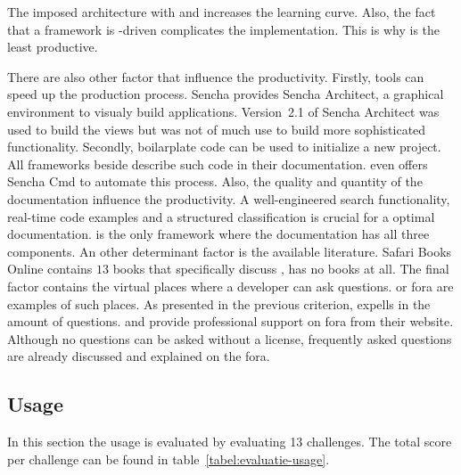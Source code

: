 \documentclass[a4paper]{artikel3}
\begin{document}

The imposed architecture with \sta{} and \kendob{} increases the learning curve.
Also, the fact that a framework is \js-driven complicates the implementation.
This is why \sta{} is the least productive.

There are also other factor that influence the productivity.
Firstly,  tools can speed up the production process.
Sencha provides Sencha Architect,  a graphical environment to visualy build applications.
Version~2.1 of Sencha Architect was used to build the views but was not of much use to build more sophisticated functionality.
Secondly,  boilarplate code can be used to initialize a new project.
All frameworks beside \lungo{} describe such code in their documentation.
\sta{} even offers Sencha Cmd to automate this process.
Also, the quality and quantity of the documentation influence the productivity.
A well-engineered search functionality,  real-time code examples and a structured classification is crucial for a optimal documentation.
\kendob{} is the only framework where the documentation has all three components.  
An other determinant factor is the available literature.
Safari Books Online contains $13$ books that specifically discuss \jqma{},  \lungo{} has no books at all.
The final factor contains the virtual places where a developer can ask questions.
\so{} or fora are examples of such places. %
As presented in the previous criterion,  \jqma{} expells in the amount of \so{} questions.
\sta{} and \kendob{} provide professional support on fora from their website.
Although no questions can be asked without a license,  frequently asked questions are already discussed and explained on the fora.


\subsection{Usage}
\label{sec:evaluation-usage}
In this section the usage is evaluated by evaluating 13 challenges.
The total score per challenge can be found in table~\ref{tabel:evaluatie-usage}.
\end{document}
